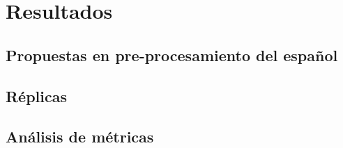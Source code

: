 \chapter{Resultados}
\label{ch:chap4}

\section{Propuestas en pre-procesamiento del español}

\section{Réplicas}

\section{Análisis de métricas}
